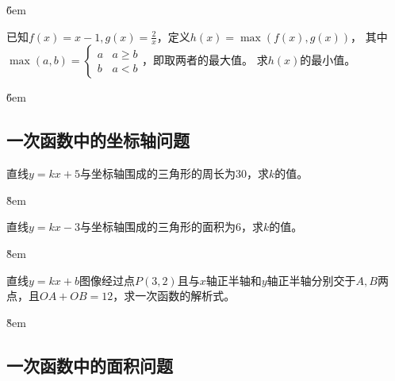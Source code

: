 \v{6em}

\begin{example}
    已知$f(x)=x-1,g(x)=\frac{2}{x}$，定义$h(x)=\max(f(x),g(x))$，
    其中$\max(a,b)=
        \begin{cases}
            a & \text{$a \ge b$}
            \\ b & \text {$a<b$}
        \end{cases}$，即取两者的最大值。
    求$h(x)$的最小值。
\end{example}

\v{6em}

\subsection{一次函数中的坐标轴问题}

\begin{example}
    直线$y=kx+5$与坐标轴围成的三角形的周长为30，求$k$的值。
\end{example}

\v{8em}

\begin{example}
    直线$y=kx-3$与坐标轴围成的三角形的面积为6，求$k$的值。
\end{example}

\v{8em}

\begin{example}
    直线$y=kx+b$图像经过点$P(3,2)$且与$x$轴正半轴和$y$轴正半轴分别交于$A,B$两点，且$OA+OB=12$，求一次函数的解析式。
\end{example}

\v{8em}

\subsection{一次函数中的面积问题}

